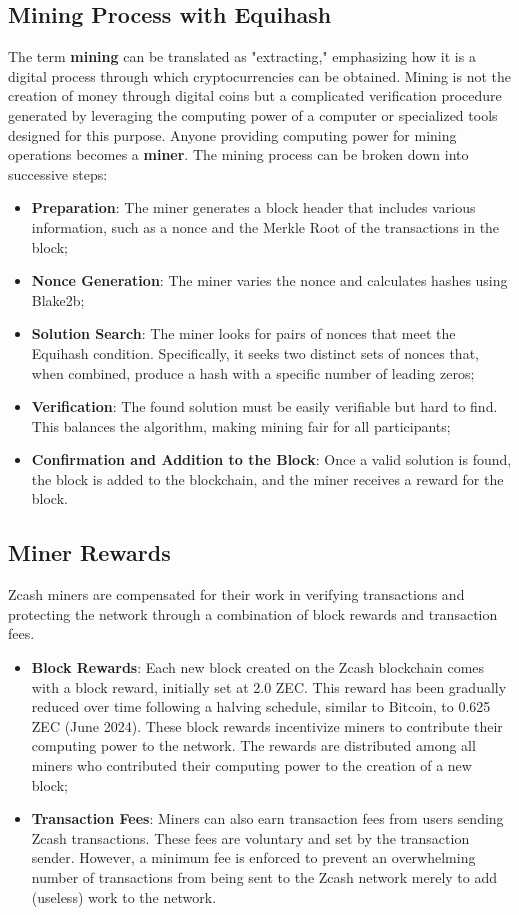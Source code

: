 \subsection{Mining Process with Equihash}

The term \textbf{mining} \cite{mining} can be translated as "extracting," emphasizing how it is a digital process through which cryptocurrencies can be obtained. Mining is not the creation of money through digital coins but a complicated verification procedure generated by leveraging the computing power of a computer or specialized tools designed for this purpose. Anyone providing computing power for mining operations becomes a \textbf{miner}. The mining process can be broken down into successive steps:
\begin{itemize}
    \item \textbf{Preparation}: The miner generates a block header that includes various information, such as a nonce and the Merkle Root of the transactions in the block;
    \item \textbf{Nonce Generation}: The miner varies the nonce and calculates hashes using Blake2b;
    \item \textbf{Solution Search}: The miner looks for pairs of nonces that meet the Equihash condition. Specifically, it seeks two distinct sets of nonces that, when combined, produce a hash with a specific number of leading zeros;
    \item \textbf{Verification}: The found solution must be easily verifiable but hard to find. This balances the algorithm, making mining fair for all participants;
    \item \textbf{Confirmation and Addition to the Block}: Once a valid solution is found, the block is added to the blockchain, and the miner receives a reward for the block.
\end{itemize}

\subsection{Miner Rewards}

Zcash miners are compensated for their work in verifying transactions and protecting the network through a combination of block rewards and transaction fees.
\begin{itemize}
    \item \textbf{Block Rewards}: Each new block created on the Zcash blockchain comes with a block reward, initially set at 2.0 ZEC. This reward has been gradually reduced over time following a halving schedule, similar to Bitcoin, to 0.625 ZEC (June 2024).
    These block rewards incentivize miners to contribute their computing power to the network. The rewards are distributed among all miners who contributed their computing power to the creation of a new block;
    \item \textbf{Transaction Fees}: Miners can also earn transaction fees from users sending Zcash transactions. These fees are voluntary and set by the transaction sender. However, a minimum fee is enforced to prevent an overwhelming number of transactions from being sent to the Zcash network merely to add (useless) work to the network.
\end{itemize}

